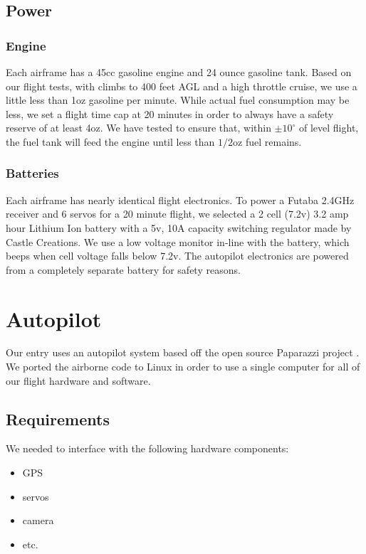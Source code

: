 \documentclass[10pt]{report}
\newcommand{\degrees}[1]
{
\begin{math}
#1^{\circ} 
\end{math}
}
\begin{document}
\subsection{Power}

\subsubsection{Engine}

Each airframe has a 45cc gasoline engine and 24 ounce gasoline tank. Based on our flight tests, with climbs to 400 feet AGL and a high throttle cruise, we use a little less than 1oz gasoline per minute. While actual fuel consumption may be less, we set a flight time cap at 20 minutes in order to always have a safety reserve of at least 4oz. We have tested to ensure that, within \degrees{\pm10} of level flight, the fuel tank will feed the engine until less than $1/2$oz fuel remains.

\subsubsection{Batteries}

Each airframe has nearly identical flight electronics. To power a Futaba 2.4GHz receiver and 6 servos for a 20 minute flight, we selected a 2 cell (7.2v) 3.2 amp hour Lithium Ion battery with a 5v, 10A capacity switching regulator made by Castle Creations. We use a low voltage monitor in-line with the battery, which beeps when cell voltage falls below 7.2v. The autopilot electronics are powered from a completely separate battery for safety reasons.

\section{Autopilot}
Our entry uses an autopilot system based off the open source Paparazzi project \cite{paparazziweb}. We ported the airborne code to Linux in order to use a single computer for all of our flight hardware and software.

\subsection{Requirements}

We needed to interface with the following hardware components:
\begin{itemize}
	\setlength{\itemsep}{0cm}
	\setlength{\parskip}{0cm}
	\item GPS
	\item servos
	\item camera
	\item etc.
\end{itemize}
\end{document}
